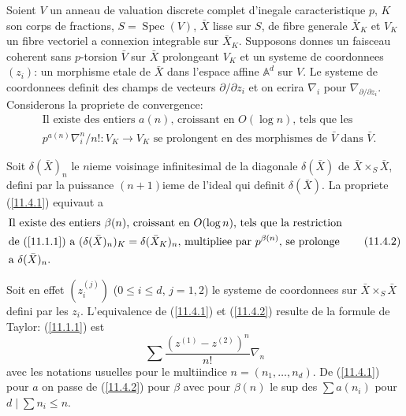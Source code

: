 \documentclass[12pt,a4paper]{article}
\theoremstyle{plain}
\theoremstyle{definition}
\theoremstyle{remark}
\DeclareMathOperator{\Spec}{Spec}
\begin{document}
Soient $V$ un anneau de valuation discrete complet d'inegale caracteristique $p$, $K$ son corps de fractions, $S = \Spec(V)$, $\bar{X}$ lisse sur $S$, de fibre generale $\bar{X}_K$ et $V_K$ un fibre vectoriel a connexion integrable sur $\bar{X}_K$. Supposons donnes un faisceau coherent sans $p$-torsion $\bar{V}$ sur $\bar{X}$ prolongeant $V_K$ et un systeme de coordonnees $(z_i)$: un morphisme etale de $\bar{X}$ dans l'espace affine $\mathbb{A}^d$ sur $V$. Le systeme de coordonnees definit des champs de vecteurs $\partial/\partial z_i$ et on ecrira $\nabla_i$ pour $\nabla_{\partial/\partial z_i}$. Considerons la propriete de convergence:
\begin{equation}\label{11.4.1}
\begin{aligned}
&\text{Il existe des entiers } a(n) \text{, croissant en } O(\log n) \text{, tels que les} \\
&p^{a(n)} \nabla_i^n/n!: V_K \to V_K \text{ se prolongent en des morphismes de } \bar{V} \text{ dans } \bar{V}.
\end{aligned} \tag{11.4.1}
\end{equation}

Soit $\delta(\bar{X})_n$ le $n$ieme voisinage infinitesimal de la diagonale $\delta(\bar{X})$ de $\bar{X} \times_S \bar{X}$, defini par la puissance $(n+1)$ieme de l'ideal qui definit $\delta(\bar{X})$. La propriete (\ref{11.4.1}) equivaut a
\begin{equation}\label{11.4.2}
\begin{aligned}
&\text{Il existe des entiers } \beta(n) \text{, croissant en } O(\log n) \text{, tels que la restriction} \\
&\text{de (\ref{11.1.1}) a } (\delta(\bar{X})_n)_K = \delta(\bar{X}_K)_n \text{, multipliee par } p^{\beta(n)} \text{, se prolonge} \\
&\text{a } \delta(\bar{X})_n.
\end{aligned} \tag{11.4.2}
\end{equation}

Soit en effet $(z_i^{(j)})$ ($0 \leq i \leq d$, $j = 1, 2$) le systeme de coordonnees sur $\bar{X} \times_S \bar{X}$ defini par les $z_i$. L'equivalence de (\ref{11.4.1}) et (\ref{11.4.2}) resulte de la formule de Taylor: (\ref{11.1.1}) est
$$\sum \frac{(z^{(1)} - z^{(2)})^n}{n!} \nabla_n$$
avec les notations usuelles pour le multiindice $n = (n_1, \ldots, n_d)$. De (\ref{11.4.1}) pour $a$ on passe de (\ref{11.4.2}) pour $\beta$ avec pour $\beta(n)$ le sup des $\sum a(n_i)$ pour $d \mid \sum n_i \leq n$.
\end{document}
